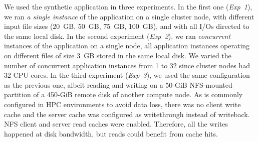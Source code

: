 We used the synthetic application in three experiments. In the
first one (\textit{Exp~1}), we ran \emph{a single instance} of
the application on a single cluster node, with different input file
sizes (20~GB, 50~GB, 75~GB, 100~GB), and with all I/Os directed to
the same local disk.
In the second experiment (\textit{Exp~2}), we ran
\emph{concurrent} instances of the application on a single node,
all application instances operating on different files of size 3~GB
stored in the same local disk. We varied the number of concurrent
application instances from 1 to 32 since cluster nodes had 32 CPU
cores.
In the third experiment (\textit{Exp~3}), we used the same
configuration as the previous one, albeit reading and writing
on a 50-GiB NFS-mounted partition of a 450-GiB remote disk of
another compute node. As is commonly configured in HPC
environments to avoid data loss, there was no client write cache
and the server cache was configured as writethrough instead of
writeback. NFS client and server read caches were enabled. 
Therefore, all the writes happened at disk bandwidth, but
reads could benefit from cache hits.

